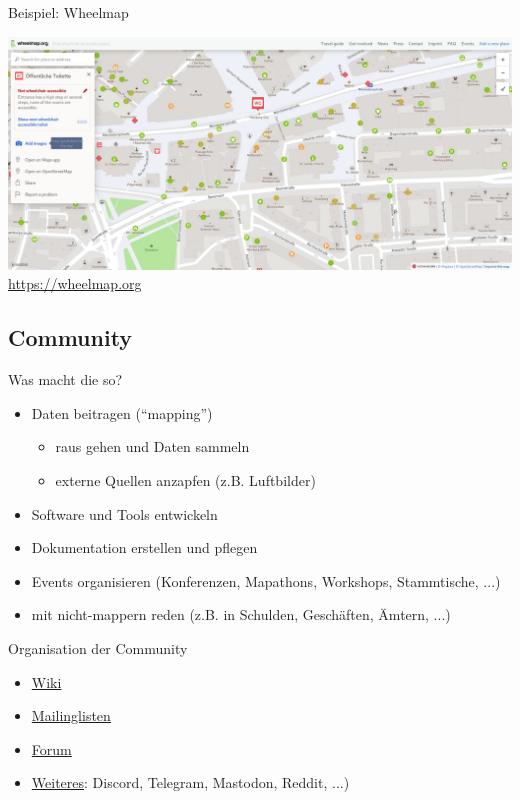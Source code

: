 \documentclass{beamer}
\begin{document}
			\begin{frame}{Beispiel: Wheelmap}
				\begin{center}
					\includegraphics[height=0.7\textheight]{images/wheelmap-website.jpg}\\
					\url{https://wheelmap.org}
				\end{center}
			\end{frame}

		\subsection{Community}
		
			\begin{frame}{Was macht die so?}
				\begin{itemize}
					\item Daten beitragen (\enquote{mapping})
					\begin{itemize}
						\item raus gehen und Daten sammeln
						\item externe Quellen anzapfen (z.B. Luftbilder)
					\end{itemize}\pause
					\item Software und Tools entwickeln\pause
					\item Dokumentation erstellen und pflegen\pause
					\item Events organisieren (Konferenzen, Mapathons, Workshops, Stammtische, ...)\pause
					\item mit nicht-mappern reden (z.B. in Schulden, Geschäften, Ämtern, ...)
				\end{itemize}
			\end{frame}
		
			\begin{frame}{Organisation der Community}
				\begin{itemize}
					\item \href{https://wiki.openstreetmap.org/}{Wiki}
					\item \href{https://wiki.openstreetmap.org/wiki/Mailing_lists}{Mailinglisten}
					\item \href{https://community.openstreetmap.org/}{Forum}
					\item \href{https://wiki.openstreetmap.org/wiki/Contact_channels}{Weiteres}: Discord, Telegram, Mastodon, Reddit, ...)
				\end{itemize}
			\end{frame}
\end{document}
